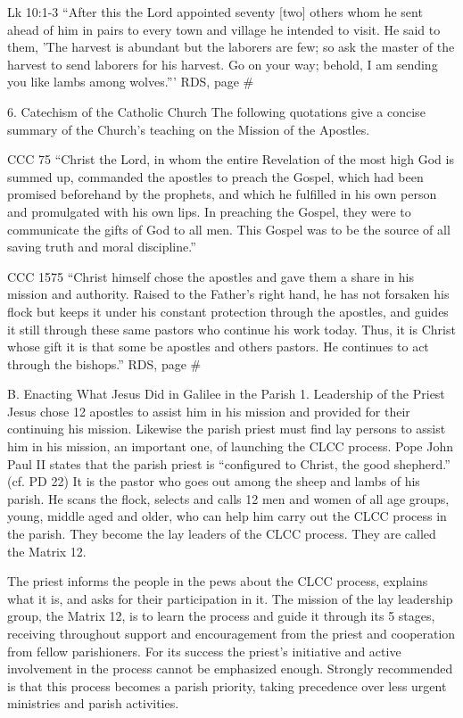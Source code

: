 \documentclass[oneside]{book}
\begin{document}
Lk 10:1-3
``After this the Lord appointed seventy [two] others whom he sent ahead of him
in pairs to every town and village he intended to visit. He said to them, 'The
harvest is abundant but the laborers are few; so ask the master of the harvest
to send laborers for his harvest. Go on your way; behold, I am sending you like
lambs among wolves.'''
RDS, page \#

6. Catechism of the Catholic Church
The following quotations give a concise summary of the Church's teaching on the
Mission of the Apostles.

CCC 75
``Christ the Lord, in whom the entire Revelation of the most high God is summed
up, commanded the apostles to preach the Gospel, which had been promised
beforehand by the prophets, and which he fulfilled in his own person and
promulgated with his own lips. In preaching the Gospel, they were to communicate
the gifts of God to all men. This Gospel was to be the source of all saving
truth and moral discipline.''

CCC 1575
``Christ himself chose the apostles and gave them a share in his mission and
authority. Raised to the Father's right hand, he has not forsaken his flock but
keeps it under his constant protection through the apostles, and guides it still
through these same pastors who continue his work today. Thus, it is Christ whose
gift it is that some be apostles and others pastors. He continues to act through
the bishops.''
RDS, page \#

B. Enacting What Jesus Did in Galilee in the Parish
1. Leadership of the Priest
Jesus chose 12 apostles to assist him in his mission and provided for their
continuing his mission. Likewise the parish priest must find lay persons to
assist him in his mission, an important one, of launching the CLCC process. Pope
John Paul II states that the parish priest is ``configured to Christ, the good
shepherd.'' (cf. PD 22) It is the pastor who goes out among the sheep and lambs
of his parish. He scans the flock, selects and calls 12 men and women of all age
groups, young, middle aged and older, who can help him carry out the CLCC
process in the parish. They become the lay leaders of the CLCC process. They are
called the Matrix 12.

The priest informs the people in the pews about the CLCC process, explains what
it is, and asks for their participation in it. The mission of the lay leadership
group, the Matrix 12, is to learn the process and guide it through its 5 stages,
receiving throughout support and encouragement from the priest and cooperation
from fellow parishioners. For its success the priest's initiative and active
involvement in the process cannot be emphasized enough. Strongly recommended is
that this process becomes a parish priority, taking precedence over less urgent
ministries and parish activities.
\end{document}
